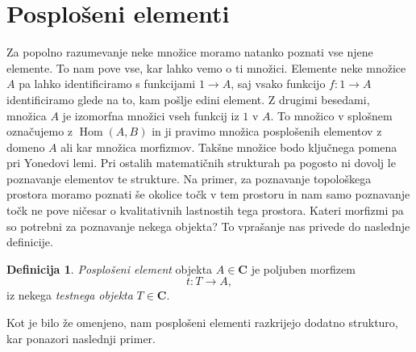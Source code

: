 \documentclass[12pt,a4paper]{book}
\theoremstyle{definition}
\newtheorem{definicija}{Definicija}[chapter]
\theoremstyle{plain}
\theoremstyle{definition}
\theoremstyle{remark}
\newcommand{\cat}[1]{\textbf{#1}}
\DeclareMathOperator{\Hom}{Hom}
\begin{document}
\section{Posplošeni elementi}
Za popolno razumevanje neke množice moramo natanko poznati vse njene elemente. To nam pove vse, kar lahko vemo o ti množici. Elemente neke množice $A$ pa lahko identificiramo s funkcijami $1 \to A$, saj vsako funkcijo $f : 1 \to A$ identificiramo glede na to, kam pošlje edini element. Z drugimi besedami, množica $A$ je izomorfna množici vseh funkcij iz $1$ v $A$. To množico v splošnem označujemo z $\Hom(A,B)$ in ji pravimo množica posplošenih elementov z domeno $A$ ali kar množica morfizmov. Takšne množice bodo ključnega pomena pri Yonedovi lemi.
Pri ostalih matematičnih strukturah pa pogosto ni dovolj le poznavanje elementov te strukture. Na primer, za poznavanje topološkega prostora moramo poznati še okolice točk v tem prostoru in nam samo poznavanje točk ne pove ničesar o kvalitativnih lastnostih tega prostora. Kateri morfizmi pa so potrebni za poznavanje nekega objekta? To vprašanje nas privede do naslednje definicije.

\begin{definicija}
\emph{Posplošeni element} objekta $A \in \cat{C}$ je poljuben morfizem 
$$t : T \to A,$$
iz nekega \emph{testnega objekta} $T \in \cat{C}$.
\end{definicija}
Kot je bilo že omenjeno, nam posplošeni elementi razkrijejo dodatno strukturo, kar ponazori naslednji primer.
\end{document}
